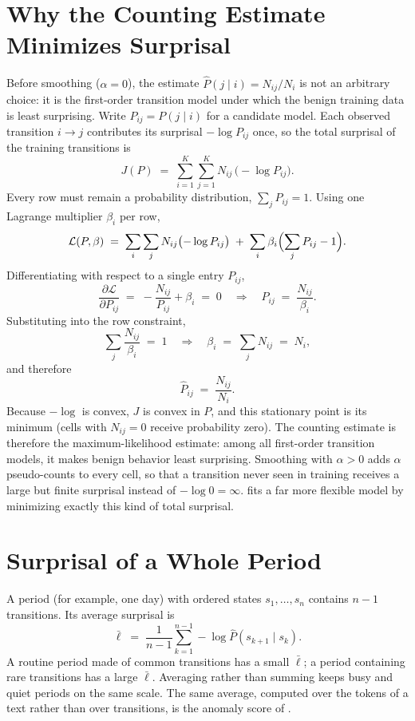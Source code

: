 \section{Why the Counting Estimate Minimizes Surprisal}
\label{sec:ctmc-mle}
Before smoothing ($\alpha = 0$), the estimate $\hat{P}(j\mid i) = N_{ij}/N_i$ is not an
arbitrary choice: it is the first-order transition model under which the benign training
data is least surprising. Write $P_{ij} = P(j \mid i)$ for a candidate model. Each observed
transition $i \to j$ contributes its surprisal $-\log P_{ij}$ once, so the total surprisal of
the training transitions is
\begin{equation}
J(P) \;=\; \sum_{i=1}^{K}\sum_{j=1}^{K} N_{ij}\,\bigl(-\log P_{ij}\bigr).
\label{eq:ctmc-total-surprisal}
\end{equation}
Every row must remain a probability distribution, $\sum_{j} P_{ij} = 1$. Using one Lagrange
multiplier $\beta_i$ per row,
\[
\mathcal{L}(P,\beta) \;=\; \sum_{i}\sum_{j} N_{ij}\bigl(-\log P_{ij}\bigr)
\;+\; \sum_{i} \beta_i\Bigl(\sum_{j} P_{ij} - 1\Bigr).
\]
Differentiating with respect to a single entry $P_{ij}$,
\[
\frac{\partial \mathcal{L}}{\partial P_{ij}} \;=\; -\frac{N_{ij}}{P_{ij}} + \beta_i \;=\; 0
\quad\Longrightarrow\quad
P_{ij} \;=\; \frac{N_{ij}}{\beta_i}.
\]
Substituting into the row constraint,
\[
\sum_{j} \frac{N_{ij}}{\beta_i} \;=\; 1
\quad\Longrightarrow\quad
\beta_i \;=\; \sum_{j} N_{ij} \;=\; N_i,
\]
and therefore
\begin{equation}
\hat{P}_{ij} \;=\; \frac{N_{ij}}{N_i}.
\label{eq:ctmc-mle}
\end{equation}
Because $-\log$ is convex, $J$ is convex in $P$, and this stationary point is its minimum
(cells with $N_{ij}=0$ receive probability zero). The counting estimate is therefore the
maximum-likelihood estimate: among all first-order transition models, it makes benign
behavior least surprising. Smoothing with $\alpha > 0$ adds $\alpha$ pseudo-counts to every
cell, so that a transition never seen in training receives a large but finite surprisal
instead of $-\log 0 = \infty$.  fits a far more flexible model by
minimizing exactly this kind of total surprisal.

\section{Surprisal of a Whole Period}
\label{sec:ctmc-period}
A period (for example, one day) with ordered states $s_1,\dots,s_n$ contains $n-1$
transitions. Its average surprisal is
\begin{equation}
\bar{\ell} \;=\; \frac{1}{n-1}\sum_{k=1}^{n-1} -\log \hat{P}(s_{k+1}\mid s_k).
\label{eq:ctmc-avg-surprisal}
\end{equation}
A routine period made of common transitions has a small $\bar{\ell}$; a period containing
rare transitions has a large $\bar{\ell}$. Averaging rather than summing keeps busy and
quiet periods on the same scale. The same average, computed over the tokens of a text rather
than over transitions, is the anomaly score of .

